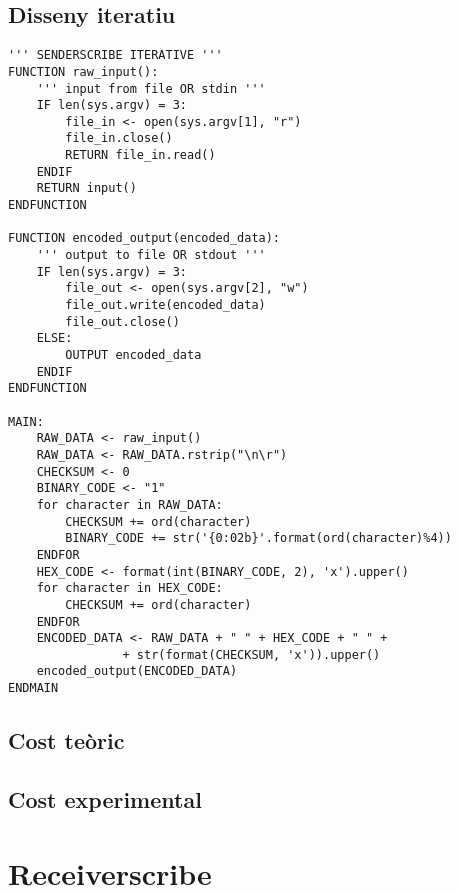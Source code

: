 \documentclass{article}
\begin{document}
\subsection{Disseny iteratiu}
\begin{lstlisting}
''' SENDERSCRIBE ITERATIVE '''
FUNCTION raw_input():
    ''' input from file OR stdin '''
    IF len(sys.argv) = 3:
        file_in <- open(sys.argv[1], "r")
        file_in.close()
        RETURN file_in.read()
    ENDIF
    RETURN input()
ENDFUNCTION

FUNCTION encoded_output(encoded_data):
    ''' output to file OR stdout '''
    IF len(sys.argv) = 3:
        file_out <- open(sys.argv[2], "w")
        file_out.write(encoded_data)
        file_out.close()
    ELSE:
        OUTPUT encoded_data
    ENDIF
ENDFUNCTION

MAIN:
    RAW_DATA <- raw_input()
    RAW_DATA <- RAW_DATA.rstrip("\n\r")
    CHECKSUM <- 0
    BINARY_CODE <- "1"
    for character in RAW_DATA:
        CHECKSUM += ord(character)
        BINARY_CODE += str('{0:02b}'.format(ord(character)%4))
    ENDFOR
    HEX_CODE <- format(int(BINARY_CODE, 2), 'x').upper()
    for character in HEX_CODE:
        CHECKSUM += ord(character)
    ENDFOR
    ENCODED_DATA <- RAW_DATA + " " + HEX_CODE + " " + 
				+ str(format(CHECKSUM, 'x')).upper()
    encoded_output(ENCODED_DATA)
ENDMAIN
\end{lstlisting}
\subsection{Cost teòric}
\subsection{Cost experimental}

\section{Receiverscribe}
\end{document}
